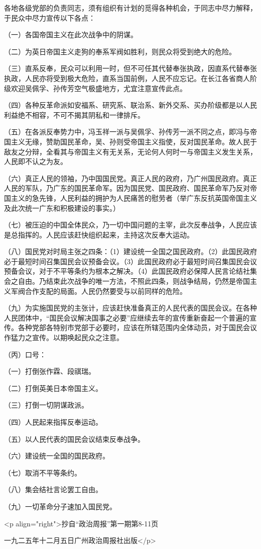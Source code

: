 各地各级党部的负责同志，须有组织有计划的觅得各种机会，于同志中尽力解释，于民众中尽力宣传以下各点：

（一）各国帝国主义在此次战争中的阴谋。

（二）为英日帝国主义走狗的奉系军阀如胜利，则民众将受到绝大的危险。

（三）直系反奉，民众可以利用一时，但不可任其代替奉张执政，因直系代替奉张执政，人民亦将受到极大危险，直系当国前例，人民不应忘记。在长江各省商人阶级欢迎吴佩孚、孙传芳空气极盛地方，尤宜注意宣传此点。

（四）各种反革命派如安福系、研究系、联治系、新外交系、买办阶级都是以人民利益绝不相容，不可不揭其阴私和一律排斥。

（五）在各派反奉势力中，冯玉祥一派与吴佩孚、孙传芳一派不同之点，即冯与帝国主义无缘，赞助国民革命，吴、孙则受帝国主义指使，反对国民革命。故人民于敌友之分辩，全看其与帝国主义有无关系，无论何人何时一与帝国主义发生关系，人民即不认之为友。

（六）真正人民的领袖，乃中国国民党。真正人民的政府，乃广州国民政府。真正人民的军队，乃广东的国民革命军。因为国民党、国民政府、国民革命军乃反对帝国主义的急先锋，人民利益的拥护为人民痛苦的慰劳者（举广东反抗英国帝国主义及此次统一广东和积极建设的事实。）

（七）被压迫的中国全体民众，乃一切中国问题的主宰，此次反奉战争，人民应该是总指挥的。人民应该赶快组织起来，主持这次反奉大运动。

（八）国民党对时局主张之四条：（1）建设统一全国之国民政府。（2）此国民政府必于最短时间召集国民会议预备会议。（3）此国民政府必于最短时间召集国民会议预备会议，对于不平等条约为根本之解决。（4）此国民政府必保障人民言论结社集会之自由。乃结束此次战争的唯一方法，不照此四条，则战争结局，仍然是帝国主义军阀合作支配的局面。人民仍然要受与以前同样的危险。

（九）为实施国民党的主张计，应该赶快准备真正的人民代表的国民会议。在各种人民团体中，“国民会议解决国事之必要”应继续去年的宣传重新奋起一个普遍的宣传。各种党部各特别市党部于必要时，应该在所辖范围内全体动员，对于国民会议作猛力之宣传。以期唤起民众之注意。

（丙）口号：

（一）打倒张作霖、段祺瑞。

（二）打倒英美日本帝国主义。

（三）打倒一切阴谋政派。

（四）人民起来指挥反奉运动。

（五）以人民代表的国民会议结束反奉战争。

（六）建设统一全国的国民政府。

（七）取消不平等条约。

（八）集会结社言论罢工自由。

（九）一切革命分子速加入国民党。

<p align="right">抄自“政治周报”第一期第8-11页

一九二五年十二月五日广州政治周报社出版</p>

